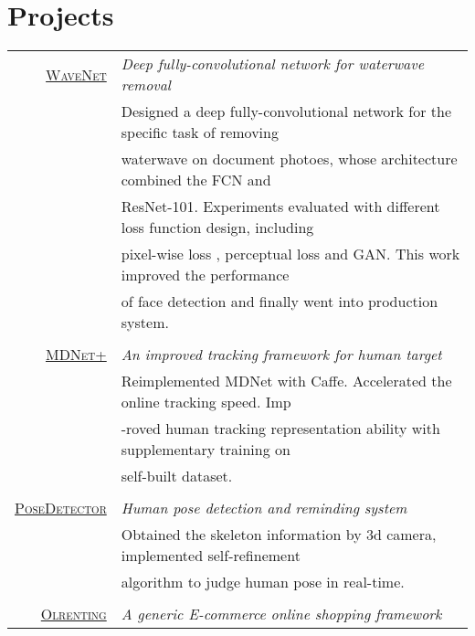 \documentclass[a4paper,10pt]{article}
\begin{document}
\section{Projects}
\begin{tabular}{rl}	
 \textsc{\href{}{WaveNet}} & \emph{Deep fully-convolutional network for waterwave removal}\\
& Designed a deep fully-convolutional network for the specific task of removing \\
& waterwave on document photoes, whose architecture combined the FCN and \\
& ResNet-101. Experiments evaluated with different loss function design, including \\
& pixel-wise loss , perceptual loss and GAN. This work improved the performance\\
& of face detection and finally went into production system.\\
\\
 \textsc{\href{https://github.com/rao1219/MDNet}{MDNet+}} & \emph{An improved tracking framework for human target}\\
& Reimplemented MDNet with Caffe. Accelerated the online tracking speed. Imp\\
& -roved human tracking representation ability with supplementary training on\\
& self-built dataset.\\
\\

 \textsc{\href{https://github.com/rao1219/intel_cup-3Dcamera}{PoseDetector}} & \emph{Human pose detection and reminding system}\\
& Obtained the skeleton information by 3d camera, implemented self-refinement \\
& algorithm to judge human pose in real-time.\\ 
\\
 \textsc{\href{https://github.com/rao1219/olhandicrafts}{Olrenting}} & \emph{A generic E-commerce online shopping framework}\\
\end{tabular}





\end{document}
